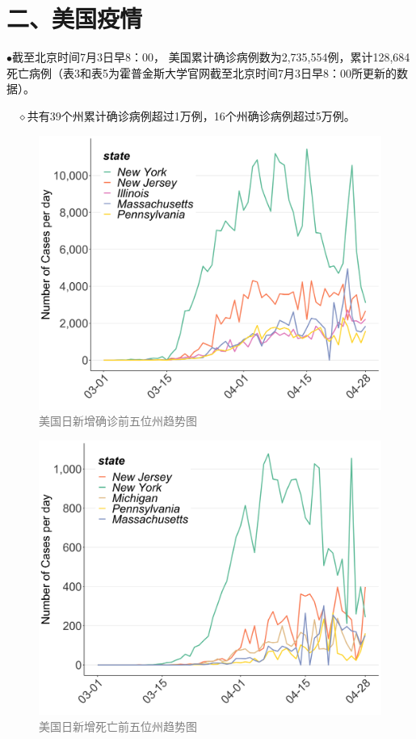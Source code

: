 \documentclass[
]{article}
\begin{document}
\hypertarget{section-3}{%
\section{\texorpdfstring{\textcolor{glaucous}{\Huge 二、美国疫情}}{}}\label{section-3}}

\vspace{-5mm}

\(\bullet\)截至北京时间7月3日早8：00，
美国累计确诊病例数为2,735,554例，累计128,684死亡病例（表3和表5为霍普金斯大学官网截至北京时间7月3日早8：00所更新的数据）。

\(\quad\)\(\diamond\)共有39个州累计确诊病例超过1万例，16个州确诊病例超过5万例。

\begin{figure}[H]
\centering
{}
\caption{\textcolor{grey}{美国日新增确诊前五位州趋势图}}
\includegraphics[]{./input/covid5.png}
\end{figure}

\begin{figure}[H]
\centering
{}
\caption{\textcolor{grey}{美国日新增死亡前五位州趋势图}}
\includegraphics[]{./input/covid6.png}
\end{figure}
\end{document}
